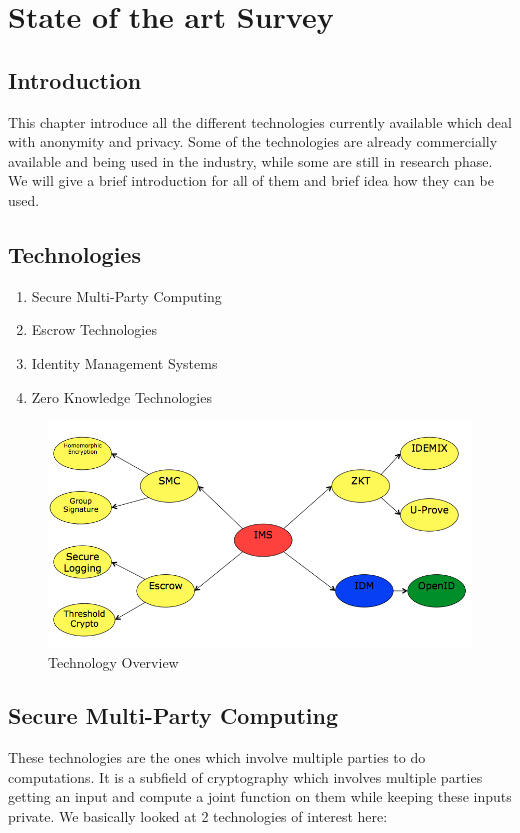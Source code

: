 \chapter{State of the art Survey}

\section{Introduction}
This chapter introduce all the different technologies currently available which deal with anonymity and privacy. Some of the technologies are already commercially available and being used in the industry, while some are still in research phase. We will give a brief introduction for all of them and brief idea how they can be used.


\section{Technologies}

\begin{enumerate}
	\item Secure Multi-Party Computing
	\item Escrow Technologies
	\item Identity Management Systems
	\item Zero Knowledge Technologies
\end{enumerate}
\begin{figure}[h]
	\centering
	\includegraphics[width=\textwidth]{figures/Technologies}
	\caption{Technology Overview}
	\label{fig:Technologies}
\end{figure}
\section{Secure Multi-Party Computing}
These technologies are the ones which involve multiple parties to do computations. It is a subfield of cryptography which involves multiple parties getting an input and compute a joint function on them while keeping these inputs private. We basically looked at 2 technologies of interest here:
